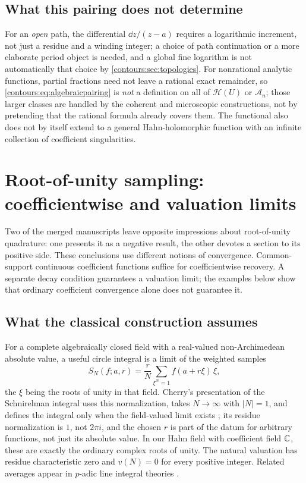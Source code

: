 \documentclass[11pt,letterpaper]{article}
\theoremstyle{definition}
\theoremstyle{remark}
\newcommand{\HH}{\mathcal H}\newcommand{\A}{\mathscr A}\newcommand{\OO}{\mathcal O}
\numberwithin{equation}{section}
\begin{document}
\subsection{What this pairing does not determine}
For an \emph{open} path, the differential $\dd z/(z-a)$ requires a logarithmic
increment, not just a residue and a winding integer; a choice of path continuation
or a more elaborate period object is needed, and a global fine logarithm is not
automatically that choice by \cref{contours:sec:topologies}. For nonrational
analytic functions, partial fractions need not leave a rational exact remainder, so
\eqref{contours:eq:algebraicpairing} is \emph{not} a definition on all of $\HH(U)$
or $\A_n$; those larger classes are handled by the coherent and microscopic
constructions, not by pretending that the rational formula already covers them. The
functional also does not by itself extend to a general Hahn-holomorphic function
with an infinite collection of coefficient singularities.

\section{Root-of-unity sampling: coefficientwise and valuation limits}
\label{contours:sec:sampling}

Two of the merged manuscripts leave opposite impressions about root-of-unity
quadrature: one presents it as a negative result, the other devotes a section to its
positive side. These conclusions use different notions of convergence.
Common-support continuous coefficient functions suffice for coefficientwise
recovery. A separate decay condition guarantees a valuation limit; the examples
below show that ordinary coefficient convergence alone does not guarantee it.

\subsection{What the classical construction assumes}
For a complete algebraically closed field with a real-valued non-Archimedean
absolute value, a useful circle integral is a limit of the weighted samples
\begin{equation}\label{contours:eq:samples}
  S_N(f;a,r)=\frac rN\sum_{\xi^N=1}f(a+r\xi)\,\xi ,
\end{equation}
the $\xi$ being the roots of unity in that field. Cherry's presentation of the
Schnirelman integral uses this normalization, takes $N\to\infty$ with $|N|=1$, and
defines the integral only when the field-valued limit exists \cite[\S1.3]{Cherry};
its residue normalization is $1$, not $2\pi i$, and the chosen $r$ is part of the
datum for arbitrary functions, not just its absolute value. In our Hahn field with
coefficient field $\mathbb C$, these are exactly the ordinary complex roots of unity.
The natural valuation has residue characteristic zero and
$v(N)=0$ for every positive integer. Related averages appear in $p$-adic line
integral theories \cite{Diamond,Ettayb}.
\end{document}
